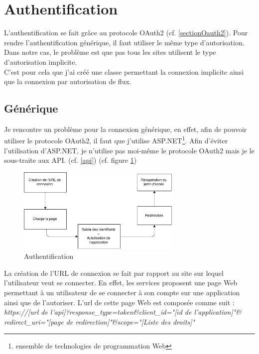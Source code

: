 \documentclass[11pt]{report} %
\begin{document}
	\newpage
	\section{Authentification}
	L'authentification se fait grâce au protocole OAuth2 (cf. \ref{sectionOauth2}). Pour rendre l'authentification générique, il faut utiliser le même type d'autorisation. Dans notre cas, le problème est que pas tous les sites utilisent le type d'autorisation implicite.\\
	C'est pour cela que j'ai créé une classe permettant la connexion implicite ainsi que la connexion par autorisation de flux.
	
	\subsection{Générique}
	Je rencontre un problème pour la connexion générique, en effet, afin de pouvoir utiliser le protocole OAuth2, il faut que j'utilise ASP.NET\footnote{ensemble de technologies de programmation Web}. 
	Afin d'éviter l'utilisation d'ASP.NET, je n'utilise pas moi-même le protocole OAuth2 mais je le sous-traite aux API. (cf. \ref{api}) (cf. figure \ref{authentification})
	
			\begin{figure}[h]
				\center
				\includegraphics[width=0.7\textwidth]{../img/auth.png}
				\caption{Authentification}
				\label{authentification}
			\end{figure}
	
	
	La création de l'URL de connexion se fait par rapport au site sur lequel l'utilisateur veut se connecter. En effet, les services proposent une page Web permettant à un utilisateur de se connecter à son compte sur une application ainsi que de l'autoriser.
	L'url de cette page Web est composée comme suit : \\
	
	\textit{https://[url de l'api]?response\_type=token\&client\_id="[id de l'application]"\& redirect\_uri="[page de redirection]"\&scope="[Liste des droits]"}\\
	
\end{document}
